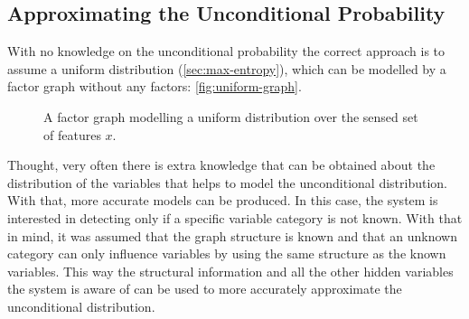 \subsection{Approximating the Unconditional Probability}

With no knowledge on the unconditional probability the correct approach is to
assume a uniform distribution (\autoref{sec:max-entropy}), which can be modelled by a
factor graph without any factors: \autoref{fig:uniform-graph}.

\begin{figure}[h]
\centering
{}
\caption{\label{fig:uniform-graph}A factor graph modelling a uniform
         distribution over the sensed set of features $x$.}
\end{figure}

Thought, very often there is extra knowledge that can be obtained about the distribution
of the variables that helps to model the unconditional distribution. With that, more accurate
models can be produced.
In this case, the system is interested in detecting only if a specific variable category is not
known. With that in mind, it was assumed that the graph structure is known and that an unknown
category can only influence variables by using the same structure as the known variables.
This way the structural information and all the other hidden variables the system is aware of
can be used to more accurately approximate the unconditional distribution.

